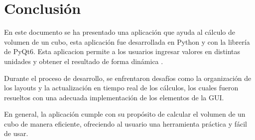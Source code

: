 \documentclass[conference]{IEEEtran}
\begin{document}
\section{Conclusión}

En este documento se ha presentado una aplicación que ayuda al cálculo de volumen de un cubo, esta aplicación fue desarrollada en Python \cite{gonzalez2023} y con la librería de PyQt6. Esta aplicacion permite a los usuarios ingresar valores en distintas unidades y obtener el resultado de forma dinámica \cite{cuevas2023}.

Durante el proceso de desarrollo, se enfrentaron desafíos como la organización de los layouts y la actualización en tiempo real de los cálculos, los cuales fueron resueltos con una adecuada implementación de los elementos de la GUI. 

En general, la aplicación cumple con su propósito de calcular el volumen de un cubo de manera eficiente, ofreciendo al usuario una herramienta práctica y fácil de usar.


\printbibliography
\end{document}
